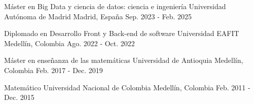 \begin{cventries}


\cventry
{Máster en Big Data y ciencia de datos: ciencia e ingeniería} %
{Universidad Autónoma de Madrid} %
{Madrid, España} %
{Sep. 2023 - Feb. 2025} %
{ %
}


\cventry
{Diplomado en Desarrollo Front y Back-end de software} %
{Universidad EAFIT} %
{Medellín, Colombia} %
{Ago. 2022 - Oct. 2022} %
{ %
}



\cventry
{Máster en enseñanza de las matemáticas} %
{Universidad de Antioquia} %
{Medellín, Colombia} %
{Feb. 2017 - Dec. 2019} %
{ %
}



\cventry
{Matemático} %
{Universidad Nacional de Colombia} %
{Medellín, Colombia} %
{Feb. 2011 - Dec. 2015} %
{ %
}


\end{cventries}

